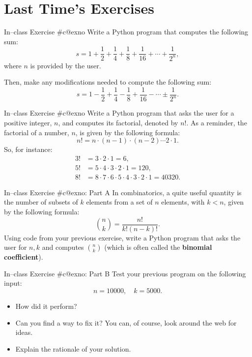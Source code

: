 \documentclass[aspectratio=169, 12pt, xcolor=table]{beamer}
\makeatletter
\newcommand{\arabicthree}[1]{\expandafter\@arabicthree\csname c@#1\endcsname}
\newcommand{\@arabicthree}[1]{\ifnum #1<100 0\fi\ifnum #1<10 0\fi\number#1}
\newcounter{exno}
\newcommand{\exno}{\stepcounter{exno}In--class Exercise \#\arabicthree{exno}}
\makeatother
\begin{document}
	\section{Last Time's Exercises}\label{sec:last-time-s-exercises}
	
	\sectionframe
	
	\setcounter{exno}{0}
	
	\begin{frame}{\exno}
		Write a Python program that computes the following sum:
		\[s=1+\frac{1}{2}+\frac{1}{4}+\frac{1}{8}+\frac{1}{16}+\cdots+\frac{1}{2^n},\]
		where $n$ is provided by the user.
		
		Then, make any modifications needed to compute the following sum:
		\[s=1-\frac{1}{2}+\frac{1}{4}-\frac{1}{8}+\frac{1}{16}-\cdots\pm\frac{1}{2^n}.\]
	\end{frame}
	
	\begin{frame}{\exno}
		Write a Python program that asks the user for a positive integer, $n$, and computes its factorial, denoted by $n!$. As a reminder, the factorial of a number, $n$, is given by the following formula:
		\[n!=n\cdot(n-1)\cdot(n-2)\cdots 2\cdot 1.\]
		So, for instance:
		\begin{align*}
		3!&=3\cdot2\cdot1=6,\\
		5!&=5\cdot4\cdot3\cdot2\cdot1=120,\\
		8!&=8\cdot7\cdot6\cdot5\cdot4\cdot3\cdot2\cdot1=40320.
		\end{align*}
	\end{frame}
	
	\begin{frame}{\exno: Part A}
		In combinatorics, a quite useful quantity is the number of subsets of $k$ elements from a set of $n$ elements, with $k<n$, given by the following formula:
		\[\binom{n}{k}=\frac{n!}{k!(n-k)!}.\]
		Using code from your previous exercise, write a Python program that asks the user for $n, k$ and computes $\binom{n}{k}$ (which is often called the \textbf{binomial coefficient}).
	\end{frame}
	
	\addtocounter{exno}{-1}
	
	\begin{frame}{\exno: Part B}
		Test your previous program on the following input:
		\[n=10000,\quad k=5000.\]
		\vspace{-\topsep}
		\begin{itemize}
			\item How did it perform?
			\item Can you find a way to fix it? You can, of course, look around the web for ideas.
			\item Explain the rationale of your solution.
		\end{itemize}
	\end{frame}
	
\end{document}
